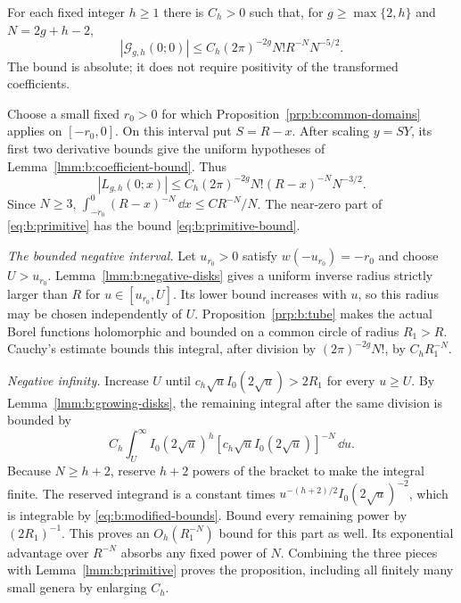 \begin{prp}\label{prp:b:primitive-bound}
For each fixed integer $h\geq1$ there is $C_h>0$ such that, for
$g\geq\max\{2,h\}$ and $N=2g+h-2$,
\begin{equation}\label{eq:b:primitive-bound}
 |\mathcal G_{g,h}(0;0)|
 \leq C_h(2\pi)^{-2g}N!R^{-N}N^{-5/2}.
\end{equation}
The bound is absolute; it does not require positivity of the
transformed coefficients.
\end{prp}
\begin{prf}
Choose a small fixed $r_0>0$ for which
Proposition~\ref{prp:b:common-domains} applies on $[-r_0,0]$.
On this interval put $S=R-x$. After scaling $y=S Y$, its first
two derivative bounds give the uniform hypotheses of
Lemma~\ref{lmm:b:coefficient-bound}. Thus
\[
 |L_{g,h}(0;x)|\leq C_h(2\pi)^{-2g}N!
                       (R-x)^{-N}N^{-3/2}.
\]
Since $N\geq3$,
$\int_{-r_0}^0(R-x)^{-N}\,\dd x\leq C R^{-N}/N$.
The near-zero part of \eqref{eq:b:primitive} has the bound
\eqref{eq:b:primitive-bound}.

\smallskip\noindent
\emph{The bounded negative interval.}
Let $u_{r_0}>0$ satisfy $w(-u_{r_0})=-r_0$ and choose
$U>u_{r_0}$. Lemma~\ref{lmm:b:negative-disks} gives a uniform
inverse radius strictly larger than $R$ for
$u\in[u_{r_0},U]$. Its lower bound increases with $u$, so
this radius may be chosen independently of $U$. Proposition~\ref{prp:b:tube} makes the
actual Borel functions holomorphic and bounded on a common circle
of radius $R_1>R$. Cauchy's estimate bounds this integral, after
division by $(2\pi)^{-2g}N!$, by $C_hR_1^{-N}$.

\smallskip\noindent
\emph{Negative infinity.}
Increase $U$ until $c_h\sqrt u I_0(2\sqrt u)>2R_1$ for every
$u\geq U$. By Lemma~\ref{lmm:b:growing-disks}, the remaining
integral after the same division is bounded by
\[
 C_h\int_U^\infty I_0(2\sqrt u)^h
              [c_h\sqrt u I_0(2\sqrt u)]^{-N}\,\dd u.
\]
Because $N\geq h+2$, reserve $h+2$ powers of the bracket to make
the integral finite. The reserved integrand is a constant times
$u^{-(h+2)/2}I_0(2\sqrt u)^{-2}$, which is integrable by
\eqref{eq:b:modified-bounds}. Bound every remaining power by
$(2R_1)^{-1}$. This proves an $O_h(R_1^{-N})$ bound for this
part as well. Its exponential advantage over $R^{-N}$ absorbs
any fixed power of $N$. Combining the three pieces with
Lemma~\ref{lmm:b:primitive} proves the proposition, including all
finitely many small genera by enlarging $C_h$.
\end{prf}

